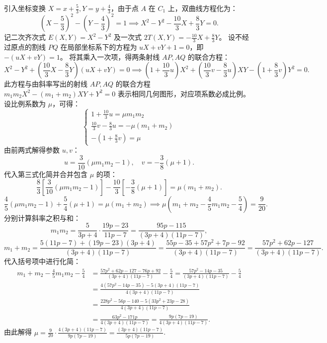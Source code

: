 \begin{solution}
引入坐标变换 $X = x + \frac{5}{3}, Y = y + \frac{4}{3}$，由于点 $A$ 在 $C_1$ 上，双曲线方程化为：
\[ \left(X - \frac{5}{3}\right)^2 - \left(Y - \frac{4}{3}\right)^2 = 1 \implies X^2 - Y^2 - \frac{10}{3}X + \frac{8}{3}Y = 0. \]
记二次齐次式 $E(X,Y) = X^2 - Y^2$ 及一次式 $2T(X,Y) = -\frac{10}{3}X + \frac{8}{3}Y$。
设不经过原点的割线 $PQ$ 在局部坐标系下的方程为 $uX + vY + 1 = 0$，即 $-(uX + vY) = 1$。
将其乘入一次项，得两条射线 $AP, AQ$ 的联合方程：
\[ X^2 - Y^2 + \left(\frac{10}{3}X - \frac{8}{3}Y\right)(uX + vY) = 0 \implies \left(1 + \frac{10}{3}u\right)X^2 + \left(\frac{10}{3}v - \frac{8}{3}u\right)XY - \left(1 + \frac{8}{3}v\right)Y^2 = 0. \]
此方程与由斜率写出的射线 $AP, AQ$ 的联合方程 $m_1 m_2 X^2 - (m_1 + m_2)XY + Y^2 = 0$ 表示相同几何图形，对应项系数必成比例。设比例系数为 $\mu$，可得：
\[ \begin{cases} 1 + \frac{10}{3}u = \mu m_1 m_2 \\ \frac{10}{3}v - \frac{8}{3}u = -\mu (m_1 + m_2) \\ -\left(1 + \frac{8}{3}v\right) = \mu \end{cases} \]
由前两式解得参数 $u, v$：
\[ u = \frac{3}{10}(\mu m_1 m_2 - 1), \quad v = -\frac{3}{8}(\mu + 1). \]
代入第三式化简并合并包含 $\mu$ 的项：
\[ \frac{8}{3}\left[\frac{3}{10}(\mu m_1 m_2 - 1)\right] - \frac{10}{3}\left[-\frac{3}{8}(\mu + 1)\right] = \mu(m_1 + m_2). \]
\[ \frac{4}{5}(\mu m_1 m_2 - 1) + \frac{5}{4}(\mu + 1) = \mu(m_1 + m_2) \implies \mu\left(m_1 + m_2 - \frac{4}{5}m_1 m_2 - \frac{5}{4}\right) = \frac{9}{20}. \]
分别计算斜率之积与和：
\[ m_1 m_2 = \frac{5}{3p + 4} \cdot \frac{19p - 23}{11p - 7} = \frac{95p - 115}{(3p + 4)(11p - 7)}, \]
\[ m_1 + m_2 = \frac{5(11p - 7) + (19p - 23)(3p + 4)}{(3p + 4)(11p - 7)} = \frac{55p - 35 + 57p^2 + 7p - 92}{(3p + 4)(11p - 7)} = \frac{57p^2 + 62p - 127}{(3p + 4)(11p - 7)}. \]
代入括号项中进行化简：
\begin{align*}
m_1 + m_2 - \frac{4}{5}m_1 m_2 - \frac{5}{4} &= \frac{57p^2 + 62p - 127 - 76p + 92}{(3p + 4)(11p - 7)} - \frac{5}{4} = \frac{57p^2 - 14p - 35}{(3p + 4)(11p - 7)} - \frac{5}{4} \\
&= \frac{4(57p^2 - 14p - 35) - 5(3p + 4)(11p - 7)}{4(3p + 4)(11p - 7)} \\
&= \frac{228p^2 - 56p - 140 - 5(33p^2 + 23p - 28)}{4(3p + 4)(11p - 7)} \\
&= \frac{63p^2 - 171p}{4(3p + 4)(11p - 7)} = \frac{9p(7p - 19)}{4(3p + 4)(11p - 7)}.
\end{align*}
由此解得 $\mu = \frac{9}{20} \cdot \frac{4(3p + 4)(11p - 7)}{9p(7p - 19)} = \frac{(3p + 4)(11p - 7)}{5p(7p - 19)}$.

\end{solution}
